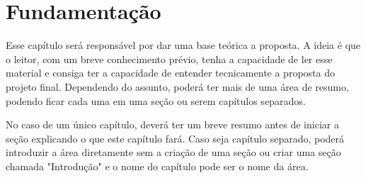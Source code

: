 \chapter{Fundamentação}\label{chp:FUNDAMENTACAO}

Esse capítulo será responsável por dar uma base teórica a proposta. 
A ideia é que o leitor, 
com um breve conhecimento prévio, 
tenha a capacidade de ler esse material e consiga ter a capacidade de entender tecnicamente a proposta do projeto final.
Dependendo do assunto,
poderá ter mais de uma área de resumo, podendo ficar cada uma em uma seção ou serem capítulos separados.

No caso de um único capítulo, deverá ter um breve resumo antes de iniciar a seção explicando o que este capítulo fará. 
Caso seja capítulo separado, poderá introduzir a área diretamente sem a criação de uma seção ou criar uma seção chamada "Introdução" e o nome do capítulo pode ser o nome da área.